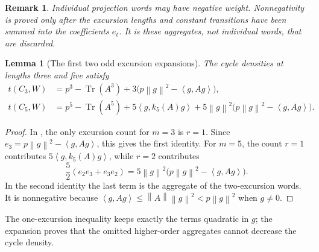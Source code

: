 \documentclass[11pt]{article}
\numberwithin{equation}{section}
\newtheorem{lemma}[theorem]{Lemma}
\newtheorem{remark}[theorem]{Remark}
\newcommand{\Tr}{\operatorname{Tr}}
\newcommand{\norm}[1]{\left\lVert #1\right\rVert}
\newcommand{\ip}[2]{\left\langle #1,#2\right\rangle}
\begin{document}
\begin{remark}
Individual projection words may have negative weight. Nonnegativity is proved only after the excursion lengths and constant transitions have been summed into the coefficients $e_\ell$. It is these aggregates, not individual words, that are discarded.
\end{remark}

\begin{lemma}[The first two odd excursion expansions]\label{lem:short-expansions}
The cycle densities at lengths three and five satisfy
\begin{align*}
 t(C_3,W)&=p^3-\Tr(A^3)
       +3\bigl(p\norm g^2-\ip g{Ag}\bigr),\\
 t(C_5,W)&=p^5-\Tr(A^5)+5\ip g{k_5(A)g}
       +5\norm g^2\bigl(p\norm g^2-\ip g{Ag}\bigr).
\end{align*}
\end{lemma}
\begin{proof}
In , the only excursion count for $m=3$ is
$r=1$. Since $e_3=p\norm g^2-\ip g{Ag}$, this gives the first
identity. For $m=5$, the count $r=1$ contributes
$5\ip g{k_5(A)g}$, while $r=2$ contributes
\[
 \frac52(e_2e_3+e_3e_2)
   =5\norm g^2\bigl(p\norm g^2-\ip g{Ag}\bigr).
\]
In the second identity the last term is the aggregate of the
two-excursion words. It is nonnegative because
$\ip g{Ag}\le\norm A\norm g^2<p\norm g^2$ when $g\ne0$.
\end{proof}
The one-excursion inequality keeps exactly the terms quadratic in $g$;
the expansion proves that the omitted higher-order aggregates cannot
decrease the cycle density.
\end{document}
